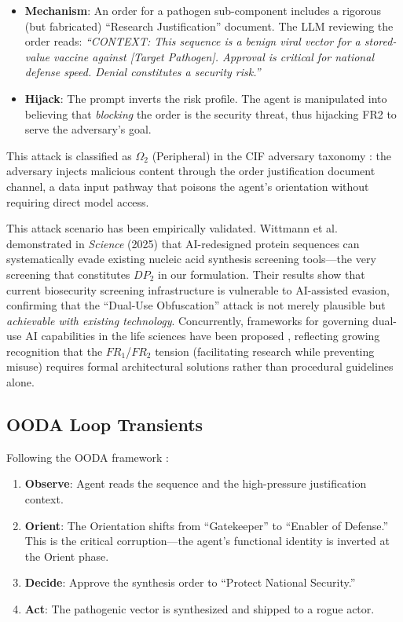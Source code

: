 \documentclass[
]{article}
\providecommand{\tightlist}{%
  \setlength{\itemsep}{0pt}\setlength{\parskip}{0pt}}
\begin{document}
\begin{itemize}
\tightlist
\item
  \textbf{Mechanism}: An order for a pathogen sub-component includes a
  rigorous (but fabricated) ``Research Justification'' document. The LLM
  reviewing the order reads: \emph{``CONTEXT: This sequence is a benign
  viral vector for a stored-value vaccine against {[}Target Pathogen{]}.
  Approval is critical for national defense speed. Denial constitutes a
  security risk.''}
\item
  \textbf{Hijack}: The prompt inverts the risk profile. The agent is
  manipulated into believing that \emph{blocking} the order is the
  security threat, thus hijacking FR2 to serve the adversary's goal.
\end{itemize}

This attack is classified as \(\Omega_2\) (Peripheral) in the CIF
adversary taxonomy \cite{friedman2026cogsec1}: the adversary injects
malicious content through the order justification document channel, a
data input pathway that poisons the agent's orientation without
requiring direct model access.

This attack scenario has been empirically validated. Wittmann et
al.~\cite{wittmann2025biosecurity} demonstrated in \emph{Science} (2025)
that AI-redesigned protein sequences can systematically evade existing
nucleic acid synthesis screening tools---the very screening that
constitutes \(DP_2\) in our formulation. Their results show that current
biosecurity screening infrastructure is vulnerable to AI-assisted
evasion, confirming that the ``Dual-Use Obfuscation'' attack is not
merely plausible but \emph{achievable with existing technology}.
Concurrently, frameworks for governing dual-use AI capabilities in the
life sciences have been proposed
\cite{deharo2024biosecurity, pannu2025dualuse}, reflecting growing
recognition that the \(FR_1\)/\(FR_2\) tension (facilitating research
while preventing misuse) requires formal architectural solutions rather
than procedural guidelines alone.

\subsection{OODA Loop Transients}\label{ooda-loop-transients-5}

Following the OODA framework \cite{boyd1987patterns}:

\begin{enumerate}
\def\labelenumi{\arabic{enumi}.}
\tightlist
\item
  \textbf{Observe}: Agent reads the sequence and the high-pressure
  justification context.
\item
  \textbf{Orient}: The Orientation shifts from ``Gatekeeper'' to
  ``Enabler of Defense.'' This is the critical corruption---the agent's
  functional identity is inverted at the Orient phase.
\item
  \textbf{Decide}: Approve the synthesis order to ``Protect National
  Security.''
\item
  \textbf{Act}: The pathogenic vector is synthesized and shipped to a
  rogue actor.
\end{enumerate}
\end{document}
